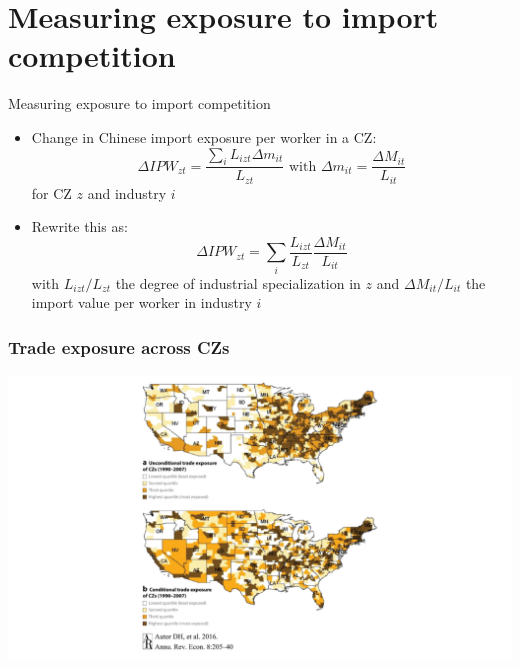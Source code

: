 \documentclass[notes=show]{beamer}
\begin{document}
\section{Measuring exposure to import competition}

\begin{frame}{Measuring exposure to import competition}
\begin{itemize}
\item Change in Chinese import exposure per worker in a CZ:
\begin{equation*}
    \Delta IPW_{zt} = \frac{\sum_{i} L_{izt} \Delta m_{it}}{L_{zt}} \text{ with } \Delta m_{it} = \frac{\Delta M_{it}}{L_{it}}
\end{equation*}
for CZ $z$ and industry $i$ \medskip
\item Rewrite this as:
\begin{equation*}
    \Delta IPW_{zt} = \sum_{i} \frac{L_{izt}}{L_{zt}} \frac{\Delta M_{it}}{L_{it}} \tag{3}
\end{equation*}
with $L_{izt} / L_{zt}$ the degree of industrial specialization in $z$ and $\Delta M_{it} / L_{it}$ the import value per worker in industry $i$
\end{itemize}
\end{frame}

\begin{frame}
\frametitle{Trade exposure across CZs}
\begin{center}
\includegraphics[width=\textwidth]{AR-fig-6.pdf}%
\end{center}
\end{frame}
\end{document}
